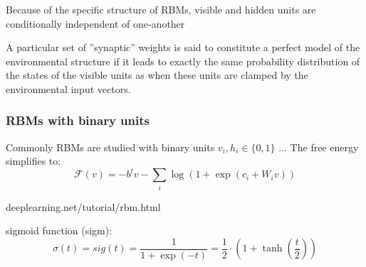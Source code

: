 \documentclass[11pt]{article}
\begin{document}
Because of the specific structure of RBMs, visible and hidden units are conditionally independent of one-another 

A particular set of ''synaptic'' weights is said to constitute a perfect model of the environmental structure if it leads to exactly the same probability distribution of the states of the visible units as when these units are clamped by the environmental input vectors.

\subsubsection*{RBMs with binary units}
Commonly RBMs are studied with binary units $v_i, h_i \in \{0,1\}$ ...
The free energy simplifies to:\\
\[
	\mathcal{F}(v)=-b^{t}v-\sum_i\log(1+\exp(c_i+W_iv))
\]

deeplearning.net/tutorial/rbm.html

sigmoid function (sigm):
\[
	\sigma(t)=sig(t)=\frac{1}{1+\exp(-t)}=\frac{1}{2}\cdot(1+\tanh(\frac{t}{2}))
\]
\end{document}
